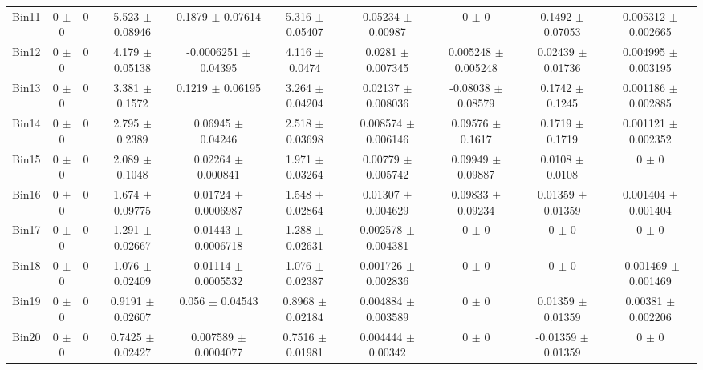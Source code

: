 \begin{tabular}{@{\extracolsep{4pt}}lccccccccc@{}}
     Bin11 & 0 $\pm$ 0 & 0 & 5.523 $\pm$ 0.08946 & 0.1879 $\pm$ 0.07614 & 5.316 $\pm$ 0.05407 & 0.05234 $\pm$ 0.00987 & 0 $\pm$ 0 & 0.1492 $\pm$ 0.07053 & 0.005312 $\pm$ 0.002665 \\ 
     Bin12 & 0 $\pm$ 0 & 0 & 4.179 $\pm$ 0.05138 & -0.0006251 $\pm$ 0.04395 & 4.116 $\pm$ 0.0474 & 0.0281 $\pm$ 0.007345 & 0.005248 $\pm$ 0.005248 & 0.02439 $\pm$ 0.01736 & 0.004995 $\pm$ 0.003195 \\ 
     Bin13 & 0 $\pm$ 0 & 0 & 3.381 $\pm$ 0.1572 & 0.1219 $\pm$ 0.06195 & 3.264 $\pm$ 0.04204 & 0.02137 $\pm$ 0.008036 & -0.08038 $\pm$ 0.08579 & 0.1742 $\pm$ 0.1245 & 0.001186 $\pm$ 0.002885 \\ 
     Bin14 & 0 $\pm$ 0 & 0 & 2.795 $\pm$ 0.2389 & 0.06945 $\pm$ 0.04246 & 2.518 $\pm$ 0.03698 & 0.008574 $\pm$ 0.006146 & 0.09576 $\pm$ 0.1617 & 0.1719 $\pm$ 0.1719 & 0.001121 $\pm$ 0.002352 \\ 
     Bin15 & 0 $\pm$ 0 & 0 & 2.089 $\pm$ 0.1048 & 0.02264 $\pm$ 0.000841 & 1.971 $\pm$ 0.03264 & 0.00779 $\pm$ 0.005742 & 0.09949 $\pm$ 0.09887 & 0.0108 $\pm$ 0.0108 & 0 $\pm$ 0 \\ 
     Bin16 & 0 $\pm$ 0 & 0 & 1.674 $\pm$ 0.09775 & 0.01724 $\pm$ 0.0006987 & 1.548 $\pm$ 0.02864 & 0.01307 $\pm$ 0.004629 & 0.09833 $\pm$ 0.09234 & 0.01359 $\pm$ 0.01359 & 0.001404 $\pm$ 0.001404 \\ 
     Bin17 & 0 $\pm$ 0 & 0 & 1.291 $\pm$ 0.02667 & 0.01443 $\pm$ 0.0006718 & 1.288 $\pm$ 0.02631 & 0.002578 $\pm$ 0.004381 & 0 $\pm$ 0 & 0 $\pm$ 0 & 0 $\pm$ 0 \\ 
     Bin18 & 0 $\pm$ 0 & 0 & 1.076 $\pm$ 0.02409 & 0.01114 $\pm$ 0.0005532 & 1.076 $\pm$ 0.02387 & 0.001726 $\pm$ 0.002836 & 0 $\pm$ 0 & 0 $\pm$ 0 & -0.001469 $\pm$ 0.001469 \\ 
     Bin19 & 0 $\pm$ 0 & 0 & 0.9191 $\pm$ 0.02607 & 0.056 $\pm$ 0.04543 & 0.8968 $\pm$ 0.02184 & 0.004884 $\pm$ 0.003589 & 0 $\pm$ 0 & 0.01359 $\pm$ 0.01359 & 0.00381 $\pm$ 0.002206 \\ 
     Bin20 & 0 $\pm$ 0 & 0 & 0.7425 $\pm$ 0.02427 & 0.007589 $\pm$ 0.0004077 & 0.7516 $\pm$ 0.01981 & 0.004444 $\pm$ 0.00342 & 0 $\pm$ 0 & -0.01359 $\pm$ 0.01359 & 0 $\pm$ 0 \\ 
\hline\hline
  \end{tabular}
